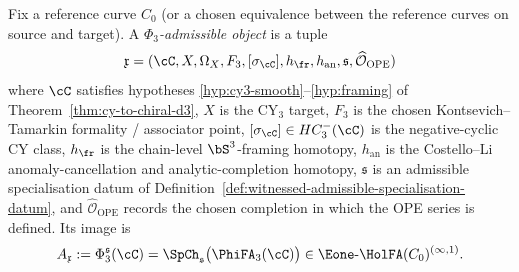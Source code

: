 \begin{definition}
\label{def:phi3-admissible-kernel-datum}
Fix a reference curve $C_0$ \textup{(}or a chosen equivalence between
the reference curves on source and target\textup{).} A
\emph{$\Phi_3$-admissible object} is a tuple
\[
 \mathfrak x=(\cC,X,\Omega_X,F_3,[\sigma_\cC],
 h_{\fr},h_{\mathrm{an}},\mathfrak s,\widehat{\mathcal O}_{\mathrm{OPE}})
\]
where $\cC$ satisfies hypotheses \textup{\ref{hyp:cy3-smooth}--\ref{hyp:framing}}
of Theorem~\ref{thm:cy-to-chiral-d3}, $X$ is the CY$_3$ target,
$F_3$ is the chosen Kontsevich--Tamarkin formality / associator point,
$[\sigma_\cC]\in HC^-_3(\cC)$ is the negative-cyclic CY class,
$h_{\fr}$ is the chain-level $\bS^3$-framing homotopy,
$h_{\mathrm{an}}$ is the Costello--Li anomaly-cancellation and
analytic-completion homotopy, $\mathfrak s$ is an admissible
specialisation datum of Definition~\ref{def:witnessed-admissible-specialisation-datum},
and $\widehat{\mathcal O}_{\mathrm{OPE}}$ records the chosen completion in which the OPE
series is defined. Its image is
\[
 A_{\mathfrak x}
 :=\Phi_3^{\mathfrak s}(\cC)
 =\SpCh_{\mathfrak s}\bigl(\PhiFA_3(\cC)\bigr)
 \in \Eone\text{-}\HolFA(C_0)^{(\infty,1)} .
\]


\end{definition}
